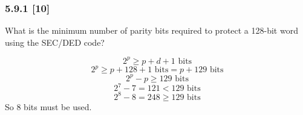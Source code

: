\documentclass[fleqn]{article}
\begin{document}
\subsubsection*{5.9.1 [10] \textrangle} What is the minimum number of parity bits required to protect a 128-bit word using the SEC/DED code?
    \begin{addmargin}[0.15cm]{0cm}
    \[2^p \ge p + d + 1 \text{ bits}\]
    \[2^p \ge p + 128 + 1 \text{ bits} = p + 129  \text{ bits}\]
    \[2^p - p \ge 129 \text{ bits}\]
    \[2^7 - 7 = 121 < 129 \text{ bits}\]
    \[2^8 - 8 = 248 \ge 129 \text{ bits}\]
    So 8 bits must be used.
\end{addmargin}
\end{document}
